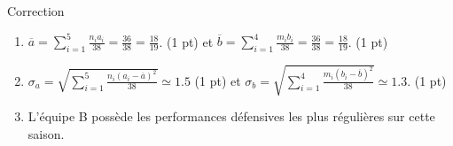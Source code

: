 \documentclass[a4paper,11pt]{article}
\theoremstyle{break}
\begin{document}
\begin{exo}
\begin{correction}

Correction 

\begin{enumerate}
 \item  $\overline{a}=\sum_{i=1}^5 \frac{n_i a_i}{38}=\frac{36}{38}=\frac{18}{19}$. (1 pt)
 et $\overline{b}=\sum_{i=1}^4 \frac{m_i b_i}{38}=\frac{36}{38}=\frac{18}{19}$. (1 pt)
 \item $\sigma_{a}=\sqrt{\sum_{i=1}^5 \frac{n_i (a_i-\overline{a})^2}{38}} \simeq 1.5$ (1 pt)
 et $\sigma_{b}=\sqrt{\sum_{i=1}^4 \frac{m_i (b_i-\overline{b})^2}{38}}\simeq 1.3$. (1 pt)
  \item L'\'equipe B poss\`ede les performances d\'efensives les plus r\' eguli\`eres sur cette saison.
\end{enumerate}

\end{correction}

\end{exo}
    
\end{document}
